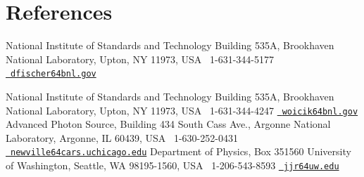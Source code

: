 \documentclass[11pt]{moderncv}
\begin{document}
\section{References}
%
{National Institute of Standards and Technology\newline
  Building 535A, Brookhaven National Laboratory, Upton, NY 11973, USA\newline
  \phonesymbol\ 1-631-344-5177\quad
  \href{mailto:dfischer@bnl.gov}{\emailsymbol\ \footnotesize\texttt{dfischer\char64bnl.gov}}}

%
{National Institute of Standards and Technology\newline
  Building 535A, Brookhaven National Laboratory, Upton, NY 11973, USA\newline
  \phonesymbol\ 1-631-344-4247\quad
  \href{mailto:woicik@bnl.gov}{\emailsymbol\ \footnotesize\texttt{woicik\char64bnl.gov}}}
%
{Advanced Photon Source, Building 434 South Cass Ave., Argonne National Laboratory, Argonne, IL 60439, USA\newline
  \phonesymbol\ 1-630-252-0431\quad
  \href{mailto:newville@cars.uchicago.edu}
  {\emailsymbol\ \footnotesize\texttt{newville\char64cars.uchicago.edu}}}
%
{Department of Physics, Box 351560\newline
  University of Washington, Seattle, WA 98195-1560, USA\newline
  \phonesymbol\ 1-206-543-8593\quad
  \href{mailto:jjr@uw.edu}{\emailsymbol\ \footnotesize\texttt{jjr\char64uw.edu}}}
\end{document}
